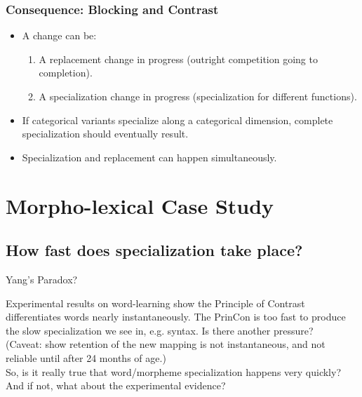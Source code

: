 \documentclass[hyperref={pdfpagelabels=false}]{beamer}
\begin{document}
\begin{frame}
\frametitle{Consequence: Blocking and Contrast}
\begin{itemize}
	\item A change can be:
		\begin{enumerate}
			\item A replacement change in progress (outright competition going to completion).
			\item A specialization change in progress (specialization for different functions).
		\end{enumerate}
	\item If categorical variants specialize along a categorical dimension, complete specialization should eventually result.
	\item Specialization and replacement can happen simultaneously.
\end{itemize}

\end{frame}



\section{Morpho-lexical Case Study}
\subsection{How fast does specialization take place?}

\begin{frame}{Yang's Paradox?}
		\begin{center}
			Experimental results on word-learning show the Principle of Contrast differentiates words nearly instantaneously. The PrinCon is too fast to produce the slow specialization we see in, e.g. syntax. Is there another pressure?\\
			\vspace*{2mm}
			\small{(Caveat: \citet{bionetal2013} show retention of the new mapping is not instantaneous, and not reliable until after 24 months of age.)}\\
			\vspace*{5mm}
			\large{So, is it really true that word/morpheme specialization happens very quickly? And if not, what about the experimental evidence?}
		\end{center}
\end{frame}
\end{document}
